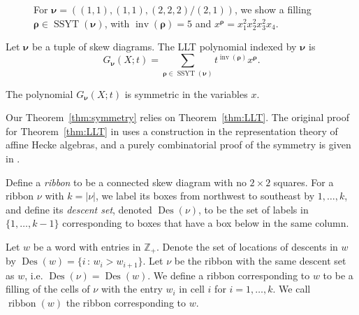 \documentclass[ALCO,Unicode]{cedram}
\DeclareMathOperator{\inv}{inv}
\DeclareMathOperator{\Des}{Des}
\DeclareMathOperator{\ribbon}{ribbon}
\DeclareMathOperator{\SSYT}{SSYT}
\newlength\cellsize \setlength\cellsize{12\unitlength}
\newcommand\cellify[1]{\def\thearg{#1}\def\nothing{}%
\ifx\thearg\nothing
\vrule width0pt height\cellsize depth0pt\else
\hbox to 0pt{\usebox2\hss}\fi%
\vbox to 12\unitlength{
\vss
\hbox to 12\unitlength{\hss$#1$\hss}
\vss}}
\newcommand\tableau[1]{\vtop{\let\\=\cr
\setlength\baselineskip{-16000pt}
\setlength\lineskiplimit{16000pt}
\setlength\lineskip{0pt}
\halign{&\cellify{##}\cr#1\crcr}}}
\begin{document}
\begin{figure}[h]
\centering
{}
\caption{For $\boldsymbol{\nu}=((1,1),(1,1),(2,2,2)/(2,1))$, we show a filling $\boldsymbol{\rho}\in\SSYT(\boldsymbol{\nu})$, with $\inv(\boldsymbol{\rho})=5$ and $x^{\boldsymbol{\rho}}=x_1^2x_2^2x_3^2x_4$.}
\label{fig:LLT1}
\end{figure}


\begin{defn}\label{def:LLT}
Let $\boldsymbol{\nu}$ be a tuple of skew diagrams. The LLT polynomial indexed by $\boldsymbol{\nu}$ is
\[
G_{\boldsymbol{\nu}}(X;t) = \sum_{\boldsymbol{\rho}\in\SSYT(\boldsymbol{\nu})} t^{\inv(\boldsymbol{\rho})}x^{\boldsymbol{\rho}}.
\]

\end{defn}
\begin{theorem}\label{thm:LLT} 
The polynomial $G_{\boldsymbol{\nu}}(X;t)$ is symmetric in the variables $x$.
\end{theorem}
\begin{remark} Our Theorem~\ref{thm:symmetry} relies on Theorem~\ref{thm:LLT}. The original proof for Theorem~\ref{thm:LLT} in \cite{LLT} uses a construction in the representation theory of affine Hecke algebras, and a purely combinatorial proof of the symmetry is given in \cite[Section 10: Appendix]{HHL05}.
\end{remark}

\begin{defn}\label{def:ribbon}
Define a \emph{ribbon} to be a connected skew diagram with no $2\times2$ squares. For a ribbon $\nu$ with $k=|\nu|$, we label its boxes from northwest to southeast by $1,\ldots,k$, and define its
{\em descent set}, denoted $\Des(\nu)$, to be the set of labels in $\{1,\ldots,k-1\}$ corresponding to boxes that have a box below in the same column.

Let $w$ be a word with entries in $\mathbb{Z}_+$. Denote the set of locations of descents in $w$ by $\Des(w) = \{i\,:\,w_i>w_{i+1}\}$. Let $\nu$ be the ribbon with the same descent set as $w$, i.e. $\Des(\nu)=\Des(w)$. We define a ribbon corresponding to $w$ to be a filling of the cells of $\nu$ with the entry $w_i$ in cell $i$ for $i=1,\ldots,k$. We call $\ribbon(w)$ the ribbon corresponding to $w$. 
\end{defn}
\end{document}

